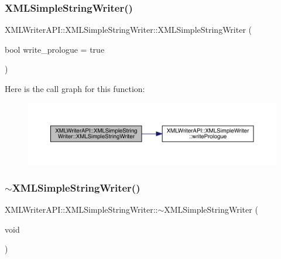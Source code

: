 \subsubsection{\texorpdfstring{XMLSimpleStringWriter()}{XMLSimpleStringWriter()}\hspace{0.1cm}{\footnotesize\ttfamily [1/3]}}
{\footnotesize\ttfamily X\+M\+L\+Writer\+A\+P\+I\+::\+X\+M\+L\+Simple\+String\+Writer\+::\+X\+M\+L\+Simple\+String\+Writer (\begin{DoxyParamCaption}\item[{bool}]{write\+\_\+prologue = {\ttfamily true} }\end{DoxyParamCaption})\hspace{0.3cm}{\ttfamily [inline]}}

Here is the call graph for this function\+:
\nopagebreak
\begin{figure}[H]
\begin{center}
\leavevmode
\includegraphics[width=350pt]{da/dec/classXMLWriterAPI_1_1XMLSimpleStringWriter_a7caa663dd64c87fa0eabc563154143a5_cgraph}
\end{center}
\end{figure}
\mbox{\label{classXMLWriterAPI_1_1XMLSimpleStringWriter_a10b08cc22793241a637eefa425e0ebe5}} 
\subsubsection{\texorpdfstring{$\sim$XMLSimpleStringWriter()}{~XMLSimpleStringWriter()}\hspace{0.1cm}{\footnotesize\ttfamily [1/3]}}
{\footnotesize\ttfamily X\+M\+L\+Writer\+A\+P\+I\+::\+X\+M\+L\+Simple\+String\+Writer\+::$\sim$\+X\+M\+L\+Simple\+String\+Writer (\begin{DoxyParamCaption}\item[{void}]{ }\end{DoxyParamCaption})\hspace{0.3cm}{\ttfamily [inline]}}

